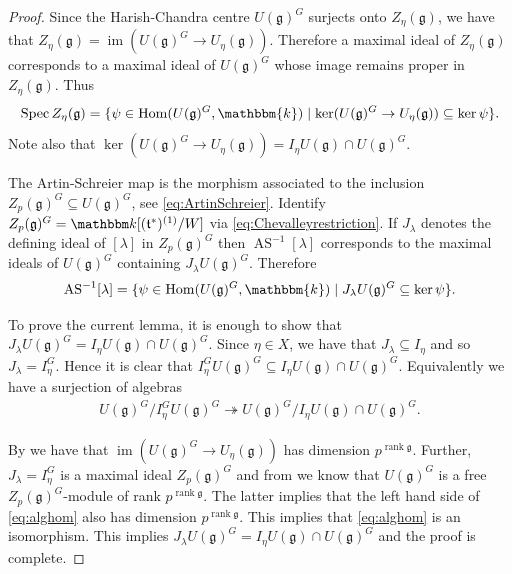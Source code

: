 \documentclass[twoside,12pt,reqno]{amsart}
\theoremstyle{remark}
\numberwithin{equation}{section}
\def\onto{\twoheadrightarrow}
\def\k{{\mathbbm k}}
\def\Spec{\operatorname{Spec}}
\def\Hom{\operatorname{Hom}}
\def\im{\operatorname{im}}
\def\rank{\operatorname{rank}}
\def\g{{\mathfrak g}}
\def\t{\mathfrak t}
\newcommand{\AS}{\operatorname{AS}}
\begin{document}
\begin{proof}
    Since the Harish-Chandra centre $U(\g)^G$ surjects onto $Z_\eta(\g)$, we have that $Z_\eta(\g) = \im(U(\g)^G \to U_\eta(\g))$.
    Therefore a maximal ideal of $Z_\eta(\g)$ corresponds to a maximal ideal of $U(\g)^G$ whose image remains proper in $Z_\eta(\g)$.
    Thus
    \begin{equation}
        \Spec Z_\eta(\g) = \{ \psi \in \Hom(U(\g)^G, \mathbbm{k}) \mid \ker(U(\g)^G \to U_\eta(\g)) \subseteq \ker \psi \}.
    \end{equation}
   Note also that $\ker(U(\g)^G \to U_\eta(\g)) = I_\eta U(\g) \cap U(\g)^G$.

    The Artin-Schreier map  is the morphism associated to the inclusion $Z_p(\g)^G \subseteq U(\g)^G$, see \eqref{eq:ArtinSchreier}.
    Identify $Z_p(\g)^G = \k[(\t^*)^{(1)}/W]$ via \eqref{eq:Chevalleyrestriction}.
    If $J_\lambda$ denotes the defining ideal of $[\lambda]$ in $Z_p(\g)^G$ then $\AS^{-1}[\lambda]$ corresponds to the maximal ideals of $U(\g)^G$ containing $J_\lambda U(\g)^G$.
    Therefore
    \begin{equation}
        \AS^{-1}[\lambda] = \{ \psi \in \Hom(U(\g)^G, \mathbbm{k}) \mid J_\lambda U(\g)^G \subseteq \ker \psi \}.
    \end{equation}

    To prove the current lemma, it is enough to show that $J_\lambda U(\g)^G = I_\eta U(\g) \cap U(\g)^G$.
    Since $\eta \in X$, we have that $J_\lambda \subseteq I_\eta$ and so $J_\lambda = I_\eta^G$.
    Hence it is clear that $I_\eta^G U(\g)^G \subseteq I_\eta U(\g) \cap U(\g)^G$. Equivalently we have a surjection of algebras
    \begin{eqnarray}
    \label{eq:alghom}
        U(\g)^G / I_\eta^G U(\g)^G \onto U(\g)^G / I_\eta U(\g) \cap U(\g)^G.
    \end{eqnarray}

    By \cite[Theorem 8.2]{Special Slices} we have that $\im(U(\g)^G \to U_\eta(\g))$ has dimension $p^{\rank \g}$.
    Further, $J_\lambda = I_\eta^G$ is a maximal ideal $Z_p(\g)^G$ and from \cite[Theorem 3.5(2)]{Brown Gordon} we know that $U(\g)^G$ is a free $Z_p(\g)^G$-module of rank $p^{\rank \g}$. The latter implies that the left hand side of \eqref{eq:alghom} also has dimension $p^{\rank\g}.$
    This implies that \eqref{eq:alghom} is an isomorphism. This implies $J_\lambda U(\g)^G = I_\eta U(\g) \cap U(\g)^G$ and the proof is complete.
\end{proof}
\end{document}

